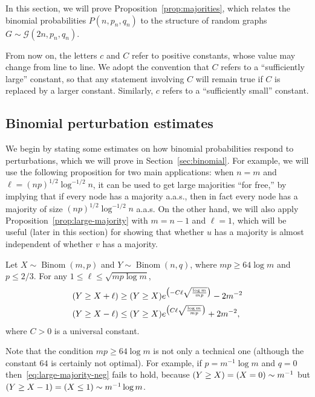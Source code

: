 \documentclass[EJP,final]{ejpecp}
\newcommand{\1}[1]{\mathbbm{1}_{\{#1\}}}
\newcommand{\calG}{\mathcal{G}}
\let\Pr\relax
\DeclareMathOperator{\Pr}{Pr}
\DeclareMathOperator{\Binom}{Binom}
\begin{document}
In this section, we will prove Proposition~\ref{prop:majorities}, which relates
the binomial probabilities $P(n, p_n, q_n)$ to the structure of
random graphs $G \sim \calG(2n, p_n, q_n)$.

From now on, the letters $c$ and $C$ refer to positive
constants, whose value may change from line to line. We adopt the convention
that $C$ refers to a ``sufficiently large'' constant, so that any statement
involving $C$ will remain true if $C$ is replaced by a larger constant.
Similarly, $c$ refers to a ``sufficiently small'' constant.

\subsection{Binomial perturbation estimates}
We begin by stating some estimates on how binomial probabilities
respond to perturbations, which we will prove in Section~\ref{sec:binomial}.
For example, we will use the following proposition for two
main applications: when $n = m$ and
$\ell = (np)^{1/2} \log^{-1/2} n$, it can be used to
get large majorities ``for free,'' by implying that if
every node has a majority a.a.s., then in fact every node has
a majority of size $(np)^{1/2} \log^{-1/2} n$ a.a.s.
On the other hand, we will also apply Proposition~\ref{prop:large-majority}
with $m = n-1$ and $\ell = 1$, which will be useful (later in this section)
for showing that whether $u$
has a majority is almost independent of whether $v$ has a majority.

\begin{proposition}\label{prop:large-majority}
 Let $X \sim \Binom(m, p)$ and $Y \sim \Binom(n, q)$,
 where $mp \ge 64 \log m$ and $p \le 2/3$. For any $1 \le \ell \le \sqrt{mp \log m}$,
 \begin{align}
  \Pr(Y \ge X + \ell) &\ge
   \Pr(Y \ge X) e^{\big( -C \ell \sqrt{\frac{\log m}{mp}}\big)} - 2m^{-2}
  \label{eq:large-majority-pos} \\
  \Pr(Y \ge X - \ell) &\le
  \Pr(Y \ge X)
  e^{\big(
    C \ell \sqrt{\frac{\log m}{mp}}\big)
  } + 2m^{-2},\label{eq:large-majority-neg}
 \end{align}
 where $C > 0$ is a universal constant.
\end{proposition}

Note that the condition $mp \ge 64 \log m$ is not only a technical one
(although the constant $64$ is certainly not optimal).
For example, if $p = m^{-1} \log m$ and $q = 0$
then~\eqref{eq:large-majority-neg} fails to hold, because
$\Pr(Y \ge X) = \Pr(X = 0) \sim m^{-1}$ but
$\Pr(Y \ge X - 1) = \Pr(X \le 1) \sim m^{-1} \log m$.
\end{document}
